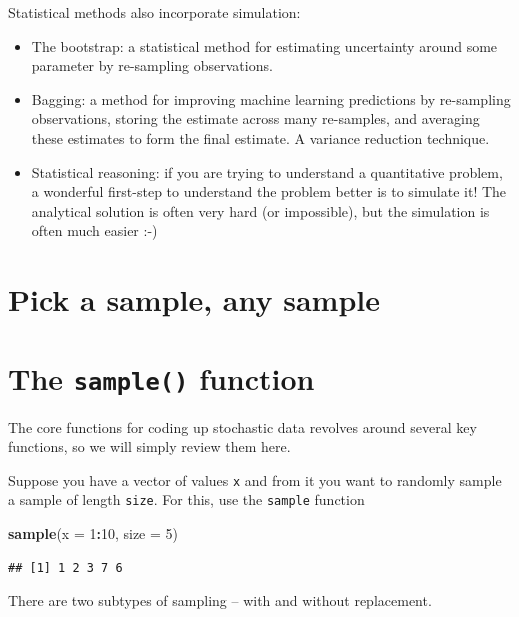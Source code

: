\documentclass[]{book}
\newenvironment{Shaded}{\begin{snugshade}}{\end{snugshade}}
\newcommand{\KeywordTok}[1]{\textcolor[rgb]{0.13,0.29,0.53}{\textbf{#1}}}
\newcommand{\DataTypeTok}[1]{\textcolor[rgb]{0.13,0.29,0.53}{#1}}
\newcommand{\DecValTok}[1]{\textcolor[rgb]{0.00,0.00,0.81}{#1}}
\newcommand{\OperatorTok}[1]{\textcolor[rgb]{0.81,0.36,0.00}{\textbf{#1}}}
\newcommand{\NormalTok}[1]{#1}
\providecommand{\tightlist}{%
  \setlength{\itemsep}{0pt}\setlength{\parskip}{0pt}}
\theoremstyle{definition}
\theoremstyle{definition}
\theoremstyle{definition}
\theoremstyle{remark}
\begin{document}
Statistical methods also incorporate simulation:

\begin{itemize}
\tightlist
\item
  The bootstrap: a statistical method for estimating uncertainty around
  some parameter by re-sampling observations.
\item
  Bagging: a method for improving machine learning predictions by
  re-sampling observations, storing the estimate across many re-samples,
  and averaging these estimates to form the final estimate. A variance
  reduction technique.
\item
  Statistical reasoning: if you are trying to understand a quantitative
  problem, a wonderful first-step to understand the problem better is to
  simulate it! The analytical solution is often very hard (or
  impossible), but the simulation is often much easier :-)
\end{itemize}

\section{Pick a sample, any sample}\label{pick-a-sample-any-sample}

\section{\texorpdfstring{The \texttt{sample()}
function}{The sample() function}}\label{the-sample-function}

The core functions for coding up stochastic data revolves around several
key functions, so we will simply review them here.

Suppose you have a vector of values \texttt{x} and from it you want to
randomly sample a sample of length \texttt{size}. For this, use the
\texttt{sample} function

\begin{Shaded}
\begin{Highlighting}[]
\KeywordTok{sample}\NormalTok{(}\DataTypeTok{x =} \DecValTok{1}\OperatorTok{:}\DecValTok{10}\NormalTok{, }\DataTypeTok{size =} \DecValTok{5}\NormalTok{)}
\end{Highlighting}
\end{Shaded}

\begin{verbatim}
## [1] 1 2 3 7 6
\end{verbatim}

There are two subtypes of sampling -- with and without replacement.
\end{document}
